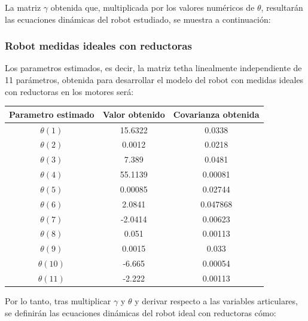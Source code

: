 La matriz $\gamma$ obtenida que, multiplicada por los valores numéricos de $\theta$, resultarán las ecuaciones dinámicas del robot estudiado, se muestra a continuación:



	\subsubsection{Robot medidas ideales con reductoras}
	Los parametros estimados, es decir, la matriz tetha linealmente independiente de 11 parámetros, obtenida para desarrollar el modelo del robot con medidas ideales con reductoras en los motores será:
	\begin{center}
		\begin{tabular}{| c | c | c |}

			\hline
			Parametro estimado & Valor obtenido & Covarianza obtenida \\
			\hline
			$\theta(1) $ & 15.6322 & 0.0338 \\
			\hline
			$\theta(2) $ & 0.0012 & 0.0218 \\
			\hline
			$\theta(3) $ & 7.389 & 0.0481 \\
			\hline
			$\theta(4) $ & 55.1139 & 0.00081 \\
			\hline
			$\theta(5) $ & 0.00085 & 0.02744 \\
			\hline
			$\theta(6) $ & 2.0841 & 0.047868 \\
			\hline
			$\theta(7) $ & -2.0414 & 0.00623 \\
			\hline
			$\theta(8) $ & 0.051 & 0.00113 \\
			\hline
			$\theta(9) $ & 0.0015 & 0.033 \\
			\hline
			$\theta(10) $ & -6.665 & 0.00054 \\
			\hline
			$\theta(11) $ & -2.222 & 0.00113 \\
			\hline


		\end{tabular}
	\end{center}
Por lo tanto, tras multiplicar $\gamma$ y $\theta$ y derivar respecto a las variables articulares, se definirán las ecuaciones dinámicas del robot ideal con reductoras cómo:\\
